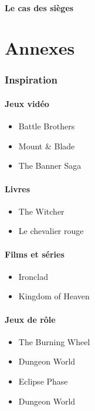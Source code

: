 \documentclass[10pt,a4paper,twocolumn]{book}
\begin{document}
\subsection{Le cas des sièges}



\part*{Annexes}
\section*{Inspiration}
\subsection*{Jeux vidéo}
\begin{itemize}
\item Battle Brothers
\item Mount \& Blade
\item The Banner Saga
\end{itemize}
\subsection*{Livres}
\begin{itemize}
\item The Witcher
\item Le chevalier rouge
\end{itemize}
\subsection*{Films et séries}
\begin{itemize}
\item Ironclad
\item Kingdom of Heaven
\end{itemize}
\subsection*{Jeux de rôle}
\begin{itemize}
\item The Burning Wheel
\item Dungeon World
\item Eclipse Phase
\item Dungeon World
\end{itemize}
\tableofcontents
\end{document}
